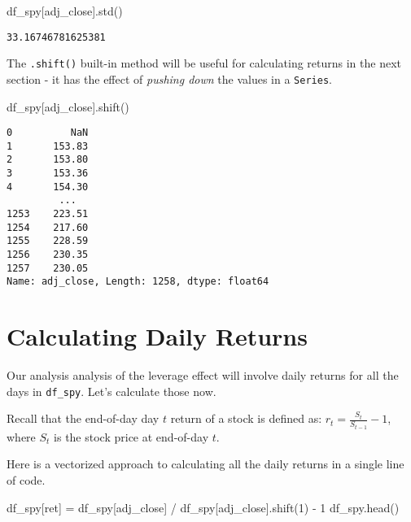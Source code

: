 \documentclass[
  letterpaper,
  DIV=11,
  numbers=noendperiod]{scrreprt}
\newenvironment{Shaded}{\begin{snugshade}}{\end{snugshade}}
\newcommand{\DecValTok}[1]{\textcolor[rgb]{0.68,0.00,0.00}{#1}}
\newcommand{\NormalTok}[1]{\textcolor[rgb]{0.00,0.23,0.31}{#1}}
\newcommand{\OperatorTok}[1]{\textcolor[rgb]{0.37,0.37,0.37}{#1}}
\newcommand{\StringTok}[1]{\textcolor[rgb]{0.13,0.47,0.30}{#1}}
\begin{document}
\begin{Shaded}
\begin{Highlighting}[]
\NormalTok{df\_spy[}\StringTok{\textquotesingle{}adj\_close\textquotesingle{}}\NormalTok{].std()}
\end{Highlighting}
\end{Shaded}

\begin{verbatim}
33.16746781625381
\end{verbatim}

The \texttt{.shift()} built-in method will be useful for calculating
returns in the next section - it has the effect of \emph{pushing down}
the values in a \texttt{Series}.

\begin{Shaded}
\begin{Highlighting}[]
\NormalTok{df\_spy[}\StringTok{\textquotesingle{}adj\_close\textquotesingle{}}\NormalTok{].shift()}
\end{Highlighting}
\end{Shaded}

\begin{verbatim}
0          NaN
1       153.83
2       153.80
3       153.36
4       154.30
         ...  
1253    223.51
1254    217.60
1255    228.59
1256    230.35
1257    230.05
Name: adj_close, Length: 1258, dtype: float64
\end{verbatim}

\hypertarget{calculating-daily-returns}{%
\section{Calculating Daily Returns}\label{calculating-daily-returns}}

Our analysis analysis of the leverage effect will involve daily returns
for all the days in \texttt{df\_spy}. Let's calculate those now.

Recall that the end-of-day day \(t\) return of a stock is defined as:
\(r_{t} = \frac{S_{t}}{S_{t-1}} - 1\), where \(S_{t}\) is the stock
price at end-of-day \(t\).

Here is a vectorized approach to calculating all the daily returns in a
single line of code.

\begin{Shaded}
\begin{Highlighting}[]
\NormalTok{df\_spy[}\StringTok{\textquotesingle{}ret\textquotesingle{}}\NormalTok{] }\OperatorTok{=}\NormalTok{ df\_spy[}\StringTok{\textquotesingle{}adj\_close\textquotesingle{}}\NormalTok{] }\OperatorTok{/}\NormalTok{ df\_spy[}\StringTok{\textquotesingle{}adj\_close\textquotesingle{}}\NormalTok{].shift(}\DecValTok{1}\NormalTok{) }\OperatorTok{{-}} \DecValTok{1}
\NormalTok{df\_spy.head()}
\end{Highlighting}
\end{Shaded}
\end{document}
